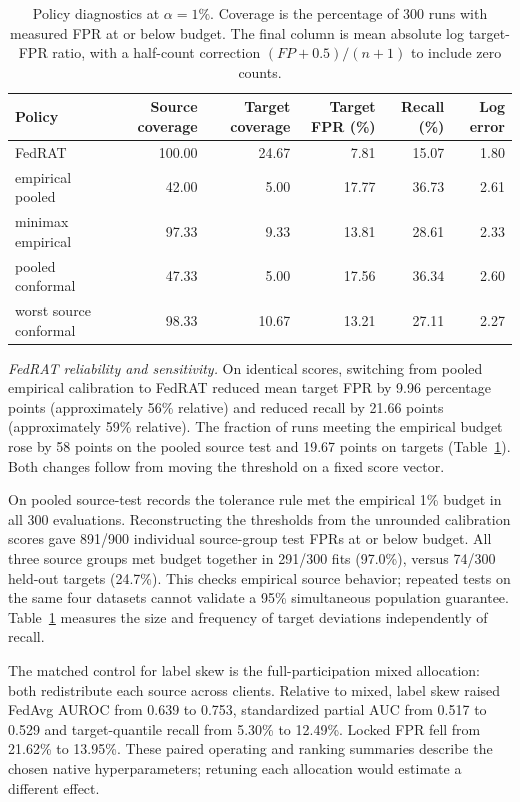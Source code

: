 \documentclass[journal,10pt]{IEEEtran}
\begin{document}
\begin{table}[t]\centering\small
\caption{Policy diagnostics at $\alpha=1\%$. Coverage is the percentage of 300 runs with measured FPR at or below budget. The final column is mean absolute log target-FPR ratio, with a half-count correction $(FP+0.5)/(n+1)$ to include zero counts.}\label{tab:nfpolicies}
\begin{tabular}{lrrrrr}\toprule
Policy & Source coverage & Target coverage & Target FPR (\%) & Recall (\%) & Log error\\\midrule
FedRAT & 100.00 & 24.67 & 7.81 & 15.07 & 1.80\\
empirical pooled & 42.00 & 5.00 & 17.77 & 36.73 & 2.61\\
minimax empirical & 97.33 & 9.33 & 13.81 & 28.61 & 2.33\\
pooled conformal & 47.33 & 5.00 & 17.56 & 36.34 & 2.60\\
worst source conformal & 98.33 & 10.67 & 13.21 & 27.11 & 2.27\\
\bottomrule\end{tabular}\end{table}


\emph{FedRAT reliability and sensitivity.} On identical scores, switching from pooled empirical calibration to FedRAT reduced mean target FPR by 9.96 percentage points (approximately 56\% relative) and reduced recall by 21.66 points (approximately 59\% relative). The fraction of runs meeting the empirical budget rose by 58 points on the pooled source test and 19.67 points on targets (Table~\ref{tab:nfpolicies}). Both changes follow from moving the threshold on a fixed score vector.

On pooled source-test records the tolerance rule met the empirical 1\% budget in all 300 evaluations. Reconstructing the thresholds from the unrounded calibration scores gave 891/900 individual source-group test FPRs at or below budget. All three source groups met budget together in 291/300 fits (97.0\%), versus 74/300 held-out targets (24.7\%). This checks empirical source behavior; repeated tests on the same four datasets cannot validate a 95\% simultaneous population guarantee. Table~\ref{tab:nfpolicies} measures the size and frequency of target deviations independently of recall.

The matched control for label skew is the full-participation mixed allocation: both redistribute each source across clients. Relative to mixed, label skew raised FedAvg AUROC from 0.639 to 0.753, standardized partial AUC from 0.517 to 0.529 and target-quantile recall from 5.30\% to 12.49\%. Locked FPR fell from 21.62\% to 13.95\%. These paired operating and ranking summaries describe the chosen native hyperparameters; retuning each allocation would estimate a different effect.
\end{document}
